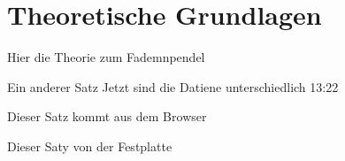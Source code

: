 \section{Theoretische Grundlagen}



Hier die Theorie zum Fademnpendel

Ein anderer Satz
 Jetzt sind die Datiene unterschiedlich 13:22
 
 Dieser Satz kommt aus dem Browser
 
 
 Dieser Saty von der Festplatte
